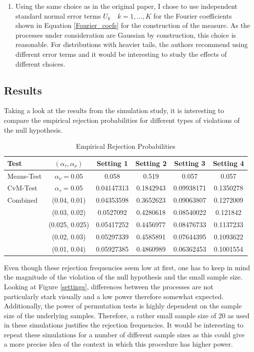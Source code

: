 \documentclass[12pt, a4paper]{article}
\theoremstyle{MAstyle} \newtheorem{assumption}{Assumption}[section]
\theoremstyle{MAstyle} \newtheorem{definition}{Definition}[section]
\theoremstyle{MAstyle} \newtheorem{theorem}{Theorem}[section]
\begin{document}
\begin{enumerate}
			\item Using the same choice as in the original paper, I chose to use independent standard normal error terms $U_k \quad k=1, \dots, K$ for the Fourier coefficients shown in Equation \ref{Fourier_coefs} for the construction of the measure. As the processes under consideration are Gaussian by construction, this choice is reasonable. For distributions with heavier tails, the authors recommend using different error terms and it would be interesting to study the effects of different choices.
		\end{enumerate}
		
		\subsection{Results}
		Taking a look at the results from the simulation study, it is interesting to compare the empirical rejection probabilities for different types of violations of the null hypothesis.
		
		\begin{table}[H]
			\centering
			\begin{tabular}{lccccc}\toprule
				\textbf{Test}	&$\left(\alpha_{\tau}, \alpha_{\nu}\right) $ &\textbf{Setting 1} &\textbf{Setting 2}	&\textbf{Setting 3} &\textbf{Setting 4}\\
				\midrule
				Means-Test		&$\alpha_{\nu} = 0.05$	& 0.058			& 0.519  	 & 0.057	  & 0.057 		\\
				CvM-Test 		&$\alpha_{\tau} = 0.05$	& 0.04147313	& 0.1842943  & 0.09938171 & 0.1350278	\\
				\midrule
				Combined		& (0.04, 0.01)			& 0.04353598	& 0.3652623  & 0.09063807 & 0.1272009 	\\
								& (0.03, 0.02)			& 0.0527092		& 0.4280618  & 0.08540022 & 0.121842 	\\
								& (0.025, 0.025)		& 0.05417252	& 0.4456977  & 0.08476733 & 0.1137233 	\\
								& (0.02, 0.03)			& 0.05297339	& 0.4585891  & 0.07644395 & 0.1093622 	\\
								& (0.01, 0.04)			& 0.05927385	& 0.4860989  & 0.06362453 & 0.1001554 	\\
				\bottomrule
			\end{tabular}
			\caption{Empirical Rejection Probabilities}
		\end{table}
		Even though these rejection frequencies seem low at first, one has to keep in mind the magnitude of the violation of the null hypothesis and the small sample size. Looking at Figure \ref{settings}, differences between the processes are not particularly stark visually and a low power therefore somewhat expected. Additionally, the power of permutation tests is highly dependent on the sample size of the underlying samples. Therefore, a rather small sample size of 20 as used in these simulations justifies the rejection frequencies.  It would be interesting to repeat these simulations for a number of different sample sizes as this could give a more precise idea of the context in which this procedure has higher power.
	
\end{document}
